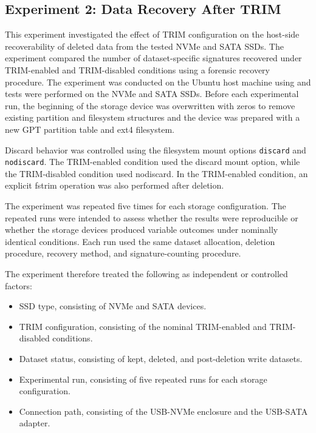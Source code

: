 \subsection{Experiment 2: Data Recovery After TRIM}
This experiment investigated the effect of TRIM configuration on the host-side recoverability of deleted data from the tested NVMe and SATA SSDs. The experiment compared 
the number of dataset-specific signatures recovered under TRIM-enabled and TRIM-disabled conditions using a forensic recovery procedure. The experiment was conducted on 
the Ubuntu host machine using and tests were performed on the NVMe and SATA SSDs. Before each experimental run, the beginning of the storage device was overwritten with 
zeros to remove existing partition and filesystem structures and the device was prepared with a new GPT partition table and ext4 filesystem.

Discard behavior was controlled using the filesystem mount options \texttt{discard} and \texttt{nodiscard}. The TRIM-enabled condition used the discard mount option, 
while the TRIM-disabled condition used nodiscard. In the TRIM-enabled condition, an explicit fstrim operation was also performed after deletion.

The experiment was repeated five times for each storage configuration. The repeated runs were intended to assess whether the results were reproducible or whether the 
storage devices produced variable outcomes under nominally identical conditions. Each run used the same dataset allocation, deletion procedure, recovery method, and 
signature-counting procedure.

The experiment therefore treated the following as independent or controlled factors:
\begin{itemize}
\item  SSD type, consisting of NVMe and SATA devices.

\item TRIM configuration, consisting of the nominal TRIM-enabled and TRIM-disabled conditions.

\item Dataset status, consisting of kept, deleted, and post-deletion write datasets.

\item Experimental run, consisting of five repeated runs for each storage configuration.

\item Connection path, consisting of the USB-NVMe enclosure and the USB-SATA adapter.
\end{itemize}

